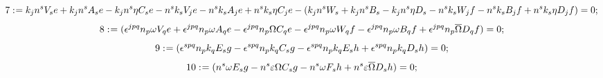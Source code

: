 \documentclass[11pt]{article}
\def\specialcolon{\mathrel{\mathop{:}}\hspace{-.5em}}
\renewcommand{\bar}[1]{\overline{#1}}
\begin{document}
\begin{dmath*}[compact, spread=2pt]
7\specialcolon{}= {k}_{j} {n}^{s} {V}_{s} e + {k}_{j} {n}^{s} {A}_{s} e - {k}_{j} {n}^{s} \eta {C}_{s} e - {n}^{s} {k}_{s} {V}_{j} e - {n}^{s} {k}_{s} {A}_{j} e + {n}^{s} {k}_{s} \eta {C}_{j} e - ({k}_{j} {n}^{s} {W}_{s} + {k}_{j} {n}^{s} {B}_{s} - {k}_{j} {n}^{s} \eta {D}_{s} - {n}^{s} {k}_{s} {W}_{j} f - {n}^{s} {k}_{s} {B}_{j} f + {n}^{s} {k}_{s} \eta {D}_{j} f) = 0;
\end{dmath*}
\begin{dmath*}[compact, spread=2pt]
8\specialcolon{}= ({\epsilon}^{j p q} {n}_{p} \omega {V}_{q} e + {\epsilon}^{j p q} {n}_{p} \omega {A}_{q} e - {\epsilon}^{j p q} {n}_{p} \Omega {C}_{q} e - {\epsilon}^{j p q} {n}_{p} \omega {W}_{q} f - {\epsilon}^{j p q} {n}_{p} \omega {B}_{q} f + {\epsilon}^{j p q} {n}_{p} \bar \Omega {D}_{q} f) = 0;
\end{dmath*}
\begin{dmath*}[compact, spread=2pt]
9\specialcolon{}= ({\epsilon}^{s p q} {n}_{p} {k}_{q} {E}_{s} g - {\epsilon}^{s p q} {n}_{p} {k}_{q} {C}_{s} g - {\epsilon}^{s p q} {n}_{p} {k}_{q} {E}_{s} h + {\epsilon}^{s p q} {n}_{p} {k}_{q} {D}_{s} h) = 0;
\end{dmath*}
\begin{dmath*}[compact, spread=2pt]
10\specialcolon{}= ({n}^{s} \omega {E}_{s} g - {n}^{s} \varepsilon \Omega {C}_{s} g - {n}^{s} \omega {F}_{s} h + {n}^{s} \varepsilon \bar \Omega {D}_{s} h) = 0;
\end{dmath*}
\end{document}
